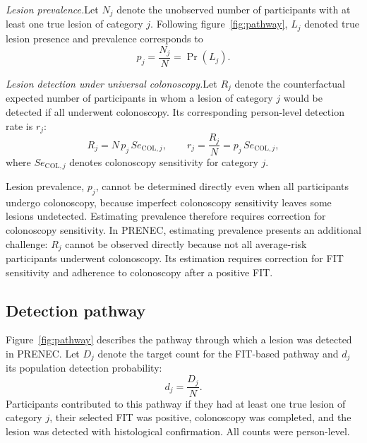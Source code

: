 \documentclass[10pt,a4paper]{article}
\newcommand{\Se}{\mathit{Se}}
\begin{document}
\textit{Lesion prevalence.}\quad Let $N_j$ denote the unobserved number of participants with at least one true lesion of category $j$. Following figure~\ref{fig:pathway}, $L_j$ denoted true lesion presence and prevalence corresponds to
\begin{equation*}
p_j=\frac{N_j}{N}=\Pr(L_j).
\end{equation*}

\textit{Lesion detection under universal colonoscopy.}\quad Let $R_j$ denote the counterfactual expected number of participants in whom a lesion of category $j$ would be detected if all underwent colonoscopy. Its corresponding person-level detection rate is $r_j$:
\begin{equation}
R_j=N\,p_j\,\Se_{\mathrm{COL},j},
\qquad
r_j=\frac{R_j}{N}=p_j\,\Se_{\mathrm{COL},j},
\label{eq:truer}
\end{equation}
where $\Se_{\mathrm{COL},j}$ denotes colonoscopy sensitivity for category $j$.

Lesion prevalence, $p_j$, cannot be determined directly even when all participants undergo colonoscopy, because imperfect colonoscopy sensitivity leaves some lesions undetected. Estimating prevalence therefore requires correction for colonoscopy sensitivity. In PRENEC, estimating prevalence presents an additional challenge: $R_j$ cannot be observed directly because not all average-risk participants underwent colonoscopy. Its estimation requires correction for FIT sensitivity and adherence to colonoscopy after a positive FIT.

\subsection*{Detection pathway}
Figure~\ref{fig:pathway} describes the pathway through which a lesion was detected in PRENEC. Let $D_j$ denote the target count for the FIT-based pathway and $d_j$ its population detection probability:
\begin{equation*}
d_j=\frac{D_j}{N}.
\end{equation*}
Participants contributed to this pathway if they had at least one true lesion of category $j$, their selected FIT was positive, colonoscopy was completed, and the lesion was detected with histological confirmation. All counts were person-level.
\end{document}
